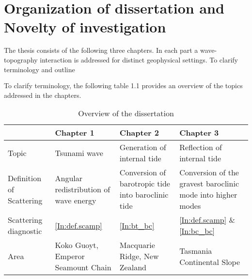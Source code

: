 \documentclass[12pt]{article}
\begin{document}
\section{Organization of dissertation and Novelty of investigation}
The thesis consists of the following three chapters. In each part a wave-topography interaction is 
addressed for distinct geophysical settings. To clarify terminology and outline 

To clarify terminology, the following table 1.1 provides an overview of the topics addressed in the 
chapters.\\
\begin{table}
\begin{tabular}[c]{ |p{2cm}||p{5cm}|p{5cm}|p{5cm}|  }
\hline
~ & Chapter 1 & Chapter 2 & Chapter 3\\
\hline
Topic & Tsunami wave & Generation of internal tide & Reflection of internal tide\\
Definition of Scattering & Angular redistribution of wave energy & Conversion of barotropic tide 
into baroclinic tide & Conversion of the gravest baroclinic mode into higher modes\\ 
Scattering diagnostic & \eqref{In:def.scamp} & \eqref{In:bt_bc} & \eqref{In:def.scamp} \& 
\eqref{In:bc_bc}\\
Area & Koko Guoyt, Emperor Seamount Chain & Macquarie Ridge, New Zealand & Tasmania Continental 
Slope\\
\hline
\end{tabular}\\
\caption{Overview of the dissertation}
\end{table}
	
\end{document}
